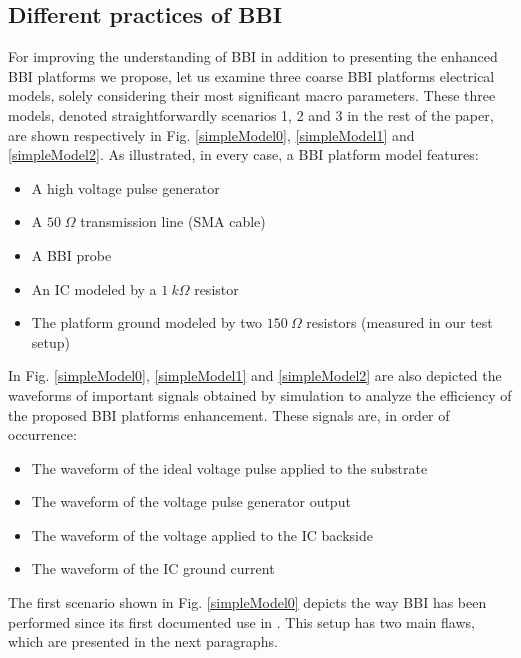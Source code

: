 \documentclass[10pt, conference, compsocconf]{IEEEtran}
\begin{document}
\subsection{Different practices of BBI}
\label{subsection:simpleModels}
For improving the understanding of BBI in addition to presenting the enhanced BBI platforms we propose, let us examine three coarse BBI platforms electrical models, solely considering their most significant macro parameters.
These three models, denoted straightforwardly scenarios 1, 2 and 3 in the rest of the paper, are shown respectively in Fig. \ref{simpleModel0}, \ref{simpleModel1} and \ref{simpleModel2}.
As illustrated, in every case, a BBI platform model features:
\begin{itemize}
\item A high voltage pulse generator
\item A $50 \; \Omega$ transmission line (SMA cable) 
\item A BBI probe
\item An IC modeled by a $1\:k\Omega$ resistor
\item The platform ground modeled by two $150\:\Omega$ resistors (measured in our test setup)
\end{itemize}
In Fig. \ref{simpleModel0}, \ref{simpleModel1} and \ref{simpleModel2} are also depicted the waveforms of important signals obtained by simulation to analyze the efficiency of the proposed BBI platforms enhancement.
These signals are, in order of occurrence:
\begin{itemize}
\item The waveform of the ideal voltage pulse applied to the substrate
\item The waveform of the voltage pulse generator output
\item The waveform of the voltage applied to the IC backside
\item The waveform of the IC ground current
\end{itemize}
The first scenario shown in Fig. \ref{simpleModel0} depicts the way BBI has been performed since its first documented use in \cite{pmaurine2012}.
This setup has two main flaws, which are presented in the next paragraphs.
\end{document}
